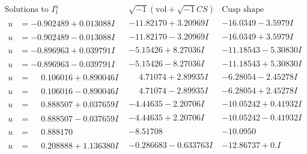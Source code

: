 \documentclass[1p]{elsarticle_modified}
\theoremstyle{definition}
\newcommand{\I}{\sqrt{-1}}
\begin{document}
$$\begin{array}{c|c|c}  
\text{Solutions to }I^u_{1}& \I (\text{vol} + \sqrt{-1}CS) & \text{Cusp shape}\\
 \hline 
\begin{aligned}
u &= -0.902489 + 0.013088 I\end{aligned}
 & -11.82170 + 3.20969 I & -16.0349 - 3.5979 I \\ \hline\begin{aligned}
u &= -0.902489 - 0.013088 I\end{aligned}
 & -11.82170 - 3.20969 I & -16.0349 + 3.5979 I \\ \hline\begin{aligned}
u &= -0.896963 + 0.039791 I\end{aligned}
 & -5.15426 + 8.27036 I & -11.18543 - 5.30830 I \\ \hline\begin{aligned}
u &= -0.896963 - 0.039791 I\end{aligned}
 & -5.15426 - 8.27036 I & -11.18543 + 5.30830 I \\ \hline\begin{aligned}
u &= \phantom{-}0.106016 + 0.890046 I\end{aligned}
 & \phantom{-}4.71074 + 2.89935 I & -6.28054 - 2.45278 I \\ \hline\begin{aligned}
u &= \phantom{-}0.106016 - 0.890046 I\end{aligned}
 & \phantom{-}4.71074 - 2.89935 I & -6.28054 + 2.45278 I \\ \hline\begin{aligned}
u &= \phantom{-}0.888507 + 0.037659 I\end{aligned}
 & -4.44635 - 2.20706 I & -10.05242 + 0.41932 I \\ \hline\begin{aligned}
u &= \phantom{-}0.888507 - 0.037659 I\end{aligned}
 & -4.44635 + 2.20706 I & -10.05242 - 0.41932 I \\ \hline\begin{aligned}
u &= \phantom{-}0.888170\phantom{ +0.000000I}\end{aligned}
 & -8.51708\phantom{ +0.000000I} & -10.0950\phantom{ +0.000000I} \\ \hline\begin{aligned}
u &= \phantom{-}0.208888 + 1.136380 I\end{aligned}
 & -0.286683 - 0.633763 I & -12.86737 + 0. I\phantom{ +0.000000I} \\ \hline\begin{aligned}

\end{aligned}
\end{array}$$
\end{document}
